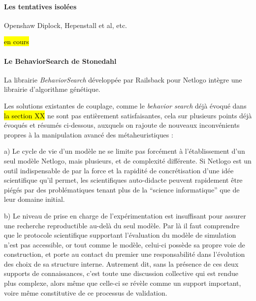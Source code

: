 \paragraph{Les tentatives isolées}

Openshaw Diplock,
Hepenstall et al, 
etc.

\hl{en cours}

\paragraph{Le {BehaviorSearch} de Stonedahl}

La librairie \textit{BehaviorSearch} développée par Railsback pour Netlogo intègre une librairie d'algorithme génétique.

Les solutions existantes de couplage, comme le \textit{behavior search} déjà évoqué dans \hl{la section XX} ne sont pas entièrement satisfaisantes, cela sur plusieurs points déjà évoqués et résumés ci-dessous, auxquels on rajoute de nouveaux inconvénients propres à la manipulation avancé des métaheuristiques : 

a) Le cycle de vie d'un modèle ne se limite pas forcément à l'établissement d'un seul modèle Netlogo, mais plusieurs, et de complexité différente. Si Netlogo est un outil indispensable de par la force et la rapidité de concrétisation d'une idée scientifique qu'il permet, les scientifiques auto-didacte peuvent rapidement être piégés par des problématiques tenant plus de la \enquote{science informatique} que de leur domaine initial.

b) Le niveau de prise en charge de l'expérimentation est insuffisant pour assurer une recherche reproductible au-delà du seul modèle. Par là il faut comprendre que le protocole scientifique supportant l'évaluation du modèle de simulation n'est pas accessible, or tout comme le modèle, celui-ci possède sa propre voie de construction, et porte au contact du premier une responsabilité dans l'évolution des choix de sa structure interne. Autrement dit, sans la présence de ces deux supports de connaissances, c'est toute une discussion collective qui est rendue plus complexe, alors même que celle-ci se révèle comme un support important, voire même constitutive de ce processus de validation.

